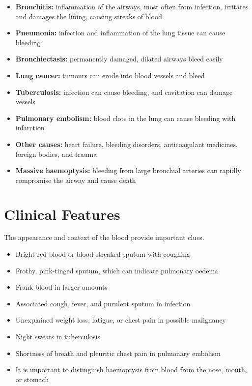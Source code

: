 \begin{itemize}
    \item \textbf{Bronchitis:} inflammation of the airways, most often from infection, irritates and damages the lining, causing streaks of blood
    \item \textbf{Pneumonia:} infection and inflammation of the lung tissue can cause bleeding
    \item \textbf{Bronchiectasis:} permanently damaged, dilated airways bleed easily
    \item \textbf{Lung cancer:} tumours can erode into blood vessels and bleed
    \item \textbf{Tuberculosis:} infection can cause bleeding, and cavitation can damage vessels
    \item \textbf{Pulmonary embolism:} blood clots in the lung can cause bleeding with infarction
    \item \textbf{Other causes:} heart failure, bleeding disorders, anticoagulant medicines, foreign bodies, and trauma
    \item \textbf{Massive haemoptysis:} bleeding from large bronchial arteries can rapidly compromise the airway and cause death
\end{itemize}

\section*{Clinical Features}
The appearance and context of the blood provide important clues.

\begin{itemize}
    \item Bright red blood or blood-streaked sputum with coughing
    \item Frothy, pink-tinged sputum, which can indicate pulmonary oedema
    \item Frank blood in larger amounts
    \item Associated cough, fever, and purulent sputum in infection
    \item Unexplained weight loss, fatigue, or chest pain in possible malignancy
    \item Night sweats in tuberculosis
    \item Shortness of breath and pleuritic chest pain in pulmonary embolism
    \item It is important to distinguish haemoptysis from blood from the nose, mouth, or stomach
\end{itemize}

